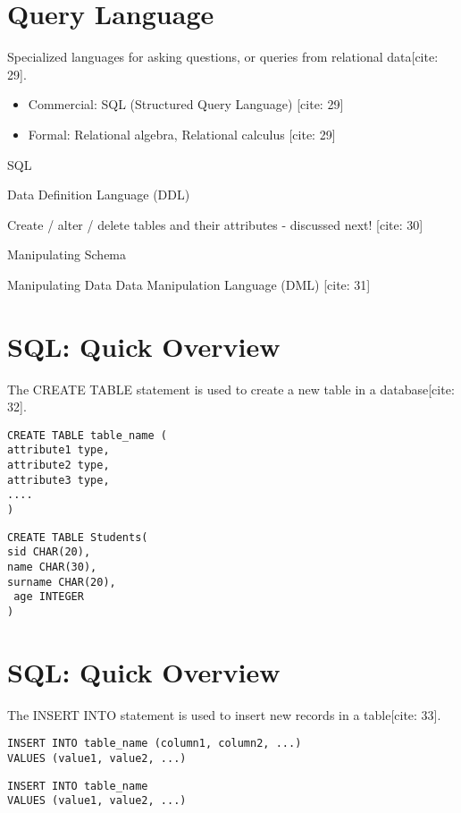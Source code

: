 \documentclass{article}
\begin{document}
\section*{Query Language}

Specialized languages for asking questions, or queries from relational data[cite: 29].

\begin{itemize}
    \item Commercial: SQL (Structured Query Language) [cite: 29]
    \item Formal: Relational algebra, Relational calculus [cite: 29]
\end{itemize}

SQL

Data Definition Language (DDL)

Create / alter / delete tables and their attributes - discussed next! [cite: 30]

Manipulating Schema

Manipulating Data Data Manipulation Language (DML) [cite: 31]

\section*{SQL: Quick Overview}

The CREATE TABLE statement is used to create a new table in a database[cite: 32].

\begin{verbatim}
CREATE TABLE table_name (
attribute1 type,
attribute2 type,
attribute3 type,
....
)
\end{verbatim}

\begin{verbatim}
CREATE TABLE Students(
sid CHAR(20),
name CHAR(30),
surname CHAR(20),
 age INTEGER
)
\end{verbatim}

\section*{SQL: Quick Overview}

The INSERT INTO statement is used to insert new records in a table[cite: 33].

\begin{verbatim}
INSERT INTO table_name (column1, column2, ...)
VALUES (value1, value2, ...)
\end{verbatim}

\begin{verbatim}
INSERT INTO table_name
VALUES (value1, value2, ...)
\end{verbatim}
\end{document}

